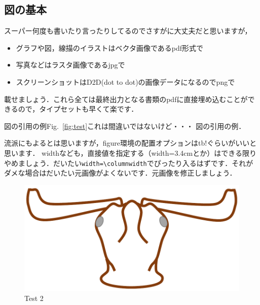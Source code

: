 \documentclass[platex,dvipdfmx]{jlreq}%
\numberwithin{equation}{section}%
\begin{document}
\subsection{図の基本}

スーパー何度も書いたり言ったりしてるのでさすがに大丈夫だと思いますが，
\begin{itemize}
 \item グラフや図，線描のイラストはベクタ画像であるpdf形式で
 \item 写真などはラスタ画像であるjpgで
 \item スクリーンショットはD2D(dot to dot)の画像データになるのでpngで
\end{itemize}
載せましょう．これら全ては最終出力となる書類のpdfに直接埋め込むことができるので，タイプセットも早くて楽です．

図の引用の例Fig.~\ref{fig:test}これは間違いではないけど・・・
図の引用の例．%

流派にもよるとは思いますが，figure環境の配置オプションはtb!ぐらいがいいと思います．
widthなども，直接値を指定する（width=3.4cmとか）はできる限りやめましょう．だいたい\verb#width=\columnwidth#でぴったり入るはずです．それがダメな場合はだいたい元画像がよくないです．元画像を修正しましょう．

\begin{figure}[tb]
 \centering %
  \includegraphics[width=\columnwidth]{./figure/testfig2.pdf}
  \caption{Test 2}
  \label{fig:test2}
\end{figure}
\fi%
\end{document}
